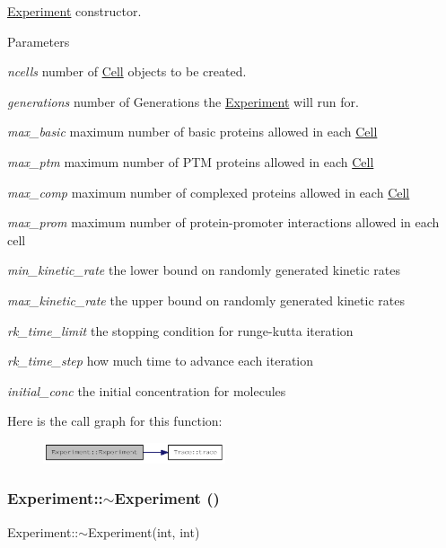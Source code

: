 \hyperlink{classExperiment}{Experiment} constructor.


\begin{DoxyParams}{Parameters}
\item[{\em ncells}]number of \hyperlink{classCell}{Cell} objects to be created. \item[{\em generations}]number of Generations the \hyperlink{classExperiment}{Experiment} will run for. \item[{\em max\_\-basic}]maximum number of basic proteins allowed in each \hyperlink{classCell}{Cell} \item[{\em max\_\-ptm}]maximum number of PTM proteins allowed in each \hyperlink{classCell}{Cell} \item[{\em max\_\-comp}]maximum number of complexed proteins allowed in each \hyperlink{classCell}{Cell} \item[{\em max\_\-prom}]maximum number of protein-\/promoter interactions allowed in each cell \item[{\em min\_\-kinetic\_\-rate}]the lower bound on randomly generated kinetic rates \item[{\em max\_\-kinetic\_\-rate}]the upper bound on randomly generated kinetic rates \item[{\em rk\_\-time\_\-limit}]the stopping condition for runge-\/kutta iteration \item[{\em rk\_\-time\_\-step}]how much time to advance each iteration \item[{\em initial\_\-conc}]the initial concentration for molecules \end{DoxyParams}


Here is the call graph for this function:\nopagebreak
\begin{figure}[H]
\begin{center}
\leavevmode
\includegraphics[width=152pt]{classExperiment_a600bd431197ce5df6c62f6647c561f7b_cgraph}
\end{center}
\end{figure}
\hypertarget{classExperiment_a96058d848040e45948bbb60623711da6}{
\subsubsection[{$\sim$Experiment}]{\setlength{\rightskip}{0pt plus 5cm}Experiment::$\sim$Experiment ()}}
\label{classExperiment_a96058d848040e45948bbb60623711da6}
Experiment::$\sim$Experiment(int, int)

